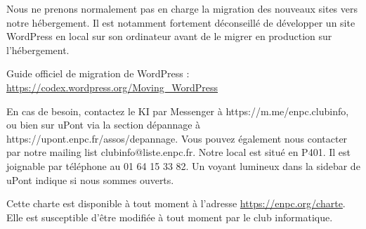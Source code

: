 \documentclass{ki019}
\begin{document}

Nous ne prenons normalement pas en charge la migration des nouveaux sites vers notre hébergement.
Il est notamment fortement déconseillé de développer un site WordPress en local sur son ordinateur avant de le migrer en production sur l'hébergement.

Guide officiel de migration de WordPress : \url{https://codex.wordpress.org/Moving_WordPress}


En cas de besoin, contactez le KI par Messenger à https://m.me/enpc.clubinfo, ou bien sur uPont via la section dépannage à https://upont.enpc.fr/assos/depannage.
Vous pouvez également nous contacter par notre mailing list clubinfo@liste.enpc.fr.
Notre local est situé en P401. Il est joignable par téléphone au 01 64 15 33 82.
Un voyant lumineux dans la sidebar de uPont indique si nous sommes ouverts.

Cette charte est disponible à tout moment à l'adresse \url{https://enpc.org/charte}. Elle est susceptible d'être modifiée à tout moment par le club informatique.

\Footer{\today}
\end{document}
